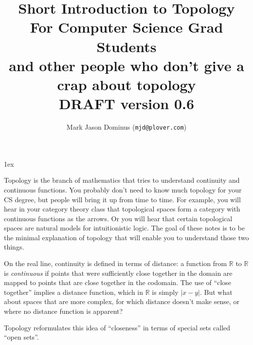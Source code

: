 \documentclass{article}
\title{Short Introduction to Topology\\{\small For Computer
    Science Grad Students\\\tiny and other people who don't give a crap
    about topology}\\{\small {\bf DRAFT} version 0.6}}
\author{Mark Jason Dominus ({\tt mjd@plover.com})}
\def\R{{\mathbb R}}
\begin{document}
\maketitle


\bigskip
\parskip 1ex

Topology is the branch of mathematics that tries to understand
continuity and continuous functions.  You probably don't need to know
much topology for your CS degree, but people will bring it up from
time to time.  For example, you will hear in your category theory
class that topological spaces form a category with continuous
functions as the arrows.  Or you will hear that certain topological
spaces are natural models for intuitionistic logic.  The goal of these
notes is to be the minimal explanation of topology that will enable
you to understand those two things.

On the real line, continuity is defined in terms of distance: a
function from $\R$ to $\R$ is {\em continuous\/} if points that were
sufficiently close together in the domain are mapped to points that
are close together in the codomain.  The use of ``close together''
implies a distance function, which in $\R$ is simply $|x-y|$.  But what
about spaces that are more complex, for which distance doesn't make
sense, or where no distance function is apparent?

Topology reformulates this idea of ``closeness'' in terms of special
sets called ``open sets''.
\end{document}
